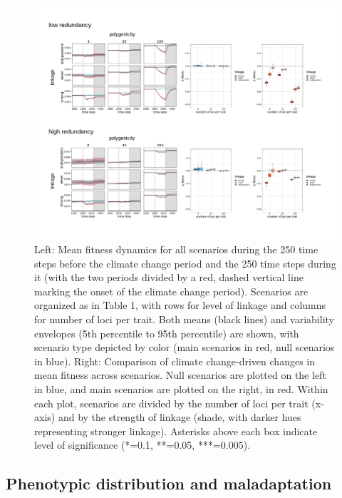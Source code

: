 \documentclass[9pt,twocolumn,twoside,lineno]{pnas-new}
\begin{document}
\begin{figure}[\sidecaptionrelwidth][t]
\centering
\includegraphics[width=17.8cm]{fit_time_series_and_boxplots.jpg}
\caption{Left: Mean fitness dynamics for all scenarios during the 250 time steps before the climate change period and the 250 time steps during it (with the two periods divided by a red, dashed vertical line marking the onset of the climate change period). Scenarios are organized as in Table 1, with rows for level of linkage and columns for number of loci per trait. Both means (black lines) and variability envelopes (5th percentile to 95th percentile) are shown, with scenario type depicted by color (main scenarios in red, null scenarios in blue). Right: Comparison of climate change-driven changes in mean fitness across scenarios. Null scenarios are plotted on the left in blue, and main scenarios are plotted on the right, in red. Within each plot, scenarios are divided by the number of loci per trait (x-axis) and by the strength of linkage (shade, with darker hues representing stronger linkage). Asterisks above each box indicate level of significance (*=0.1, **=0.05, ***=0.005).}
\label{fig:fit_over_time_and_boxplots}
\end{figure}


\subsection{Phenotypic distribution and maladaptation}
\end{document}
